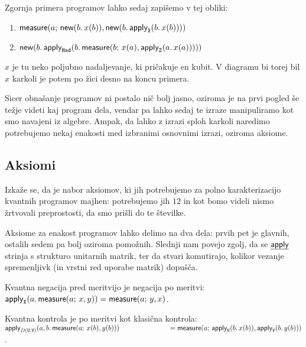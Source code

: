 \begin{examples}
    Zgornja primera programov lahko sedaj zapišemo v tej obliki:
    \begin{enumerate}
        \item \(\textnormal{\sffamily measure}{\left( {a;\,\textnormal{\sffamily new}{\left( {b.\,x(b)} \right)},\textnormal{\sffamily new}{\left( {b.\,\textnormal{\sffamily apply}_{\mathtt{X}}{\left( {b.\,x(b)} \right)}} \right)}} \right)}\)
        \item \(\textnormal{\sffamily new}{\left( {b.\,\textnormal{\sffamily apply}_{\mathtt{\mathtt{Had}}}{\left( {b.\,\textnormal{\sffamily measure}{\left( {b;\,x(a),\textnormal{\sffamily apply}_{\mathtt{Z}}{\left( {a.\,x(a)} \right)}} \right)}} \right)}} \right)}\)
    \end{enumerate}
    \(x\) je tu neko poljubno nadaljevanje, ki pričakuje en kubit.
    V diagramu bi torej bil \(x\) karkoli je potem po žici desno na koncu primera.

    Sicer obnašanje programov ni postalo nič bolj jasno, oziroma je na prvi pogled še težje videti kaj program dela, vendar pa lahko sedaj te izraze manipuliramo kot smo navajeni iz algebre.
    Ampak, da lahko z izrazi sploh karkoli naredimo potrebujemo nekaj enakosti med izbranimi osnovnimi izrazi, oziroma aksiome.
\end{examples}

\subsection{Aksiomi}
Izkaže se, da je nabor aksiomov, ki jih potrebujemo za polno karakterizacijo kvantnih programov majhen: potrebujemo jih \(12\) in kot bomo videli nismo žrtvovali preprostosti, da smo prišli do te številke.

Aksiome za enakost programov\cite{algeff-lin-qpl} lahko delimo na dva dela: prvih pet je glavnih, ostalih sedem pa bolj  oziroma pomožnih.
Slednji nam povejo zgolj, da se \(\eff{apply}\) strinja s strukturo unitarnih matrik,
ter da stvari komutirajo, kolikor vezanje spremenljivk (in vrstni red uporabe matrik) dopušča.

\begin{axiom}{Kvantna negacija pred meritvijo je negacija po meritvi:}\label{ax:1}
    \( \textnormal{\sffamily apply}_{\mathtt{X}}{\left( {a.\,\textnormal{\sffamily measure}{\left( {a;\,x,y} \right)}} \right)} = \textnormal{\sffamily measure}{\left( {a;\,y,x} \right)} \).
\end{axiom}

\begin{axiom}{Kvantna kontrola je po meritvi kot klasična kontrola:}\label{ax:2}
    \( \textnormal{\sffamily apply}_{D{\left( {\mathtt{U, V}} \right)}}{\left( {a,b.\,\textnormal{\sffamily measure}{\left( {a;\,x(b),y(b)} \right)}} \right)}\\
       \text{\hspace{7em}} = \textnormal{\sffamily measure}{\left( {a;\,\textnormal{\sffamily apply}_{\mathtt{U}}{\left( {b.\,x(b)} \right)},\textnormal{\sffamily apply}_{\mathtt{V}}{\left( {b.\,y(b)} \right)}} \right)} \).
\end{axiom}

